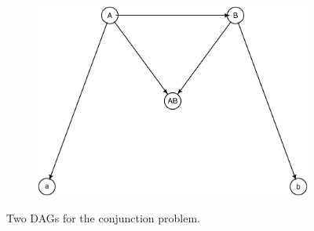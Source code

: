 \documentclass[
  10pt,
  dvipsnames,enabledeprecatedfontcommands]{scrartcl}
\begin{document}
\begin{figure}[H]
\hspace{2mm} 
\hspace{5mm}\begin{subfigure}[!ht]{0.45\textwidth}
\vspace{1mm}

\begin{center}\includegraphics[width=1\linewidth]{conjunction-appendix5_files/figure-latex/unnamed-chunk-3-1} \end{center}
\end{subfigure}
\normalsize
\caption{Two DAGs for the conjunction problem.}
\label{fig:conjunctionBNs}
\end{figure}
\end{document}

